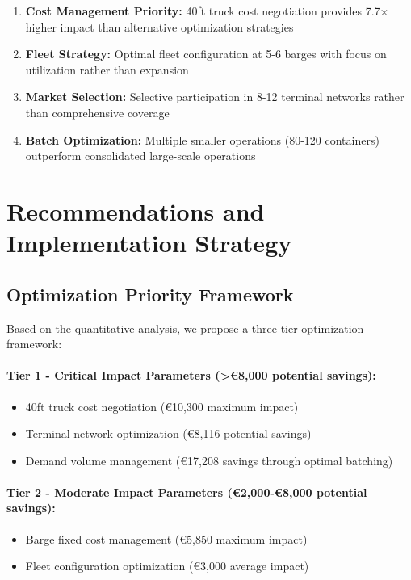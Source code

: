 \documentclass[12pt,a4paper]{article}
\begin{document}
\begin{enumerate}
    \item \textbf{Cost Management Priority:} 40ft truck cost negotiation provides 7.7× higher impact than alternative optimization strategies
    \item \textbf{Fleet Strategy:} Optimal fleet configuration at 5-6 barges with focus on utilization rather than expansion
    \item \textbf{Market Selection:} Selective participation in 8-12 terminal networks rather than comprehensive coverage
    \item \textbf{Batch Optimization:} Multiple smaller operations (80-120 containers) outperform consolidated large-scale operations
\end{enumerate}

\section{Recommendations and Implementation Strategy}

\subsection{Optimization Priority Framework}

Based on the quantitative analysis, we propose a three-tier optimization framework:

\paragraph{Tier 1 - Critical Impact Parameters (>€8,000 potential savings):}
\begin{itemize}
    \item 40ft truck cost negotiation (€10,300 maximum impact)
    \item Terminal network optimization (€8,116 potential savings)
    \item Demand volume management (€17,208 savings through optimal batching)
\end{itemize}

\paragraph{Tier 2 - Moderate Impact Parameters (€2,000-€8,000 potential savings):}
\begin{itemize}
    \item Barge fixed cost management (€5,850 maximum impact)
    \item Fleet configuration optimization (€3,000 average impact)
\end{itemize}
\end{document}
